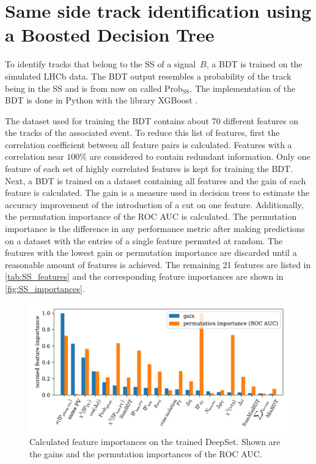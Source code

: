 \section{Same side track identification using a Boosted Decision Tree}
\label{sec:SS_classifier}

To identify tracks that belong to the SS of a signal~$B$, a BDT is trained on the simulated LHCb data. 
The BDT output resembles a probability of the track being in the SS and is from now on called $\text{Prob}_\text{SS}$.
The implementation of the BDT is done in Python with the library XGBoost \cite{xgboost}.

The dataset used for training the BDT contains about 70 different features on the tracks of the associated event.
To reduce this list of features, first the correlation coefficient between all feature pairs is calculated.
Features with a correlation near $100\%$ are considered to contain redundant information.
Only one feature of each set of highly correlated features is kept for training the BDT.
Next, a BDT is trained on a dataset containing all features and the gain of each feature is calculated.
The gain is a measure used in decision trees to estimate the accuracy improvement of the introduction of a cut on one feature.
Additionally, the permutation importance of the ROC AUC is calculated.
The permutation importance is the difference in any performance metric after making predictions on a dataset with the entries of a single feature permuted at random.
The features with the lowest gain or permutation importance are discarded until a reasonable amount of features is achieved.
The remaining 21 features are listed in \autoref{tab:SS_features} and the corresponding feature importances are shown in \autoref{fig:SS_importances}.

\begin{figure}
    \centering
    \includegraphics[width=\textwidth]{images/SS_feature_importances.pdf}
    \caption{Calculated feature importances on the trained DeepSet. Shown are the gains and the permutation importances of the ROC AUC.}
    \label{fig:SS_importances}
\end{figure}

